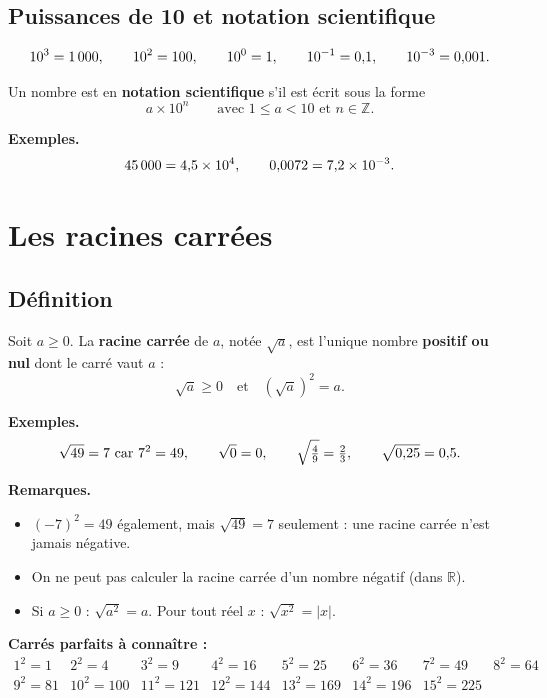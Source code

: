 \documentclass[../main.tex]{subfiles}
\begin{document}
\subsection{Puissances de 10 et notation scientifique}

\[
10^3 = 1\,000, \qquad 10^2 = 100, \qquad 10^0 = 1, \qquad 10^{-1} = 0{,} 1, \qquad 10^{-3} = 0{,} 001.
\]

\begin{definition}
Un nombre est en \textbf{notation scientifique} s'il est écrit sous la forme
\[
a \times 10^n \qquad\text{avec } 1 \leq a < 10 \text{ et } n \in \mathbb{Z}.
\]
\end{definition}

\textbf{Exemples.}
\[
45\,000 = 4{,} 5 \times 10^4, \qquad 0{,} 0072 = 7{,} 2 \times 10^{-3}.
\]

\section{Les racines carrées}

\subsection{Définition}

\begin{definition}
Soit $a \geq 0$. La \textbf{racine carrée} de $a$, notée $\sqrt{a}$, est l'unique nombre \textbf{positif ou nul} dont le carré vaut $a$ :
\[
\sqrt{a} \geq 0 \quad\text{et}\quad \left(\sqrt{a}\right)^2 = a.
\]
\end{definition}

\textbf{Exemples.}
\[
\sqrt{49} = 7 \text{ car } 7^2 = 49, \qquad \sqrt{0} = 0, \qquad \sqrt{\tfrac{4}{9}} = \tfrac{2}{3}, \qquad \sqrt{0{,} 25} = 0{,} 5.
\]

\textbf{Remarques.}
\begin{itemize}
  \item $(-7)^2 = 49$ également, mais $\sqrt{49} = 7$ seulement : une racine carrée n'est jamais négative.
  \item On ne peut pas calculer la racine carrée d'un nombre négatif (dans $\mathbb{R}$).
  \item Si $a \geq 0$ : $\sqrt{a^2} = a$. Pour tout réel $x$ : $\sqrt{x^2} = |x|$.
\end{itemize}

\textbf{Carrés parfaits à connaître :}
\[
\begin{array}{llllllll}
1^2 = 1 & 2^2 = 4 & 3^2 = 9 & 4^2 = 16 & 5^2 = 25 & 6^2 = 36 & 7^2 = 49 & 8^2 = 64 \\
9^2 = 81 & 10^2 = 100 & 11^2 = 121 & 12^2 = 144 & 13^2 = 169 & 14^2 = 196 & 15^2 = 225 &
\end{array}
\]
\end{document}
